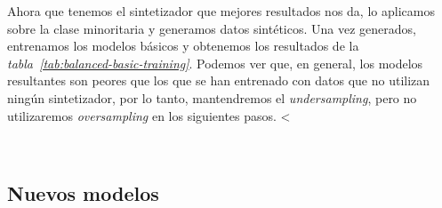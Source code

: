 Ahora que tenemos el sintetizador que mejores resultados nos da, lo aplicamos sobre la clase minoritaria y generamos datos sintéticos. Una vez generados, entrenamos los modelos básicos y obtenemos los resultados de la \textit{tabla\ \ref{tab:balanced-basic-training}}. Podemos ver que, en general, los modelos resultantes son peores que los que se han entrenado con datos que no utilizan ningún sintetizador, por lo tanto, mantendremos el \textit{undersampling}, pero no utilizaremos \textit{oversampling} en los siguientes pasos.
<

\begin{table}[!ht]
    \centering
    \caption{Resultados de entrenar los modelos básicos habiendo balanceado el \textit{dataset}. Fuente propia.}\ \label{tab:balanced-basic-training}
\end{table}

\clearpage
\subsection{Nuevos modelos}

